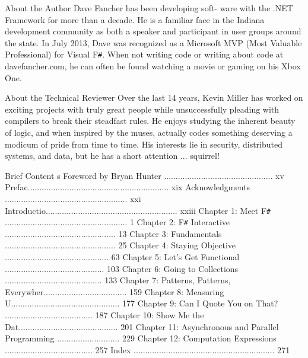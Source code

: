 \documentclass{book}
\begin{document}
About the Author
Dave Fancher has been developing soft-
ware with the .NET Framework for more
than a decade. He is a familiar face in
the Indiana development community as
both a speaker and participant in user
groups around the state. In July 2013,
Dave was recognized as a Microsoft MVP
(Most Valuable Professional) for Visual F\verb|#|.
When not writing code or writing about
code at davefancher.com, he can often be
found watching a movie or gaming on his
Xbox One.

About the Technical Reviewer
Over the last 14 years, Kevin Miller has
worked on exciting projects with truly great
people while unsuccessfully pleading with
compilers to break their steadfast rules. He
enjoys studying the inherent beauty of logic,
and when inspired by the muses, actually
codes something deserving a modicum of
pride from time to time. His interests lie in
security, distributed systems, and data, but
he has a short attention ... squirrel!


Brief Content s
Foreword by Bryan Hunter ............................................... xv
Prefac............................................................. xix
Acknowledgments ..................................................... xxi
Introductio......................................................... xxiii
Chapter 1: Meet F\verb|#| ..................................................... 1
Chapter 2: F\verb|#| Interactive ................................................ 13
Chapter 3: Fundamentals ................................................ 25
Chapter 4: Staying Objective ............................................. 63
Chapter 5: Let’s Get Functional ........................................... 103
Chapter 6: Going to Collections .......................................... 133
Chapter 7: Patterns, Patterns, Everywher.................................... 159
Chapter 8: Measuring U............................................... 177
Chapter 9: Can I Quote You on That? ...................................... 187
Chapter 10: Show Me the Dat........................................... 201
Chapter 11: Asynchronous and Parallel Programming ........................... 229
Chapter 12: Computation Expressions ...................................... 257
Index ............................................................. 271
\end{document}
